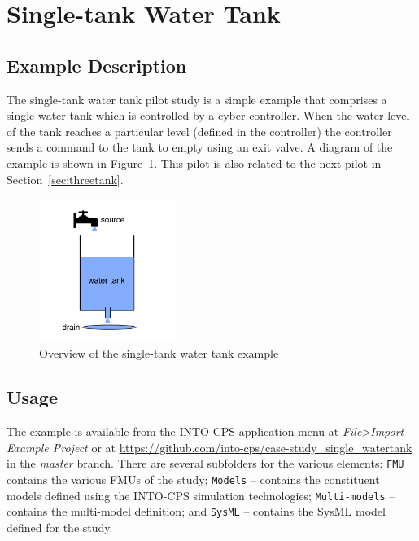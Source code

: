 \section{Single-tank Water Tank}
\label{sec:singletank}

\subsection{Example Description}
\label{sec:singletank_desc}

The single-tank water tank pilot study is a simple example that comprises a single water tank which is controlled by a cyber controller. When the water level of the tank reaches a particular level (defined in the controller) the controller sends a command to the tank to empty using an exit valve. A diagram of the example is shown in Figure~\ref{fig:singletankoverview}. 
This pilot is also related to the next pilot in Section~\ref{sec:threetank}. 

\begin{figure}[htbp]
\begin{center}
\includegraphics[width=0.4\textwidth]{singletank/singletank}
\caption{Overview of the single-tank water tank example}
\label{fig:singletankoverview}
\end{center}
\end{figure}

\subsection{Usage}
\label{sec:singletank_usage}

The example is available from the INTO-CPS application menu at \emph{File>Import Example Project} or at \url{https://github.com/into-cps/case-study\_single\_watertank} in the \emph{master} branch. There are several subfolders for the various elements: \texttt{FMU} contains the various FMUs of the study; \texttt{Models} -- contains the constituent models defined using the INTO-CPS simulation technologies; \texttt{Multi-models} -- contains the multi-model definition;  and \texttt{SysML} -- contains the SysML model defined for the study.

